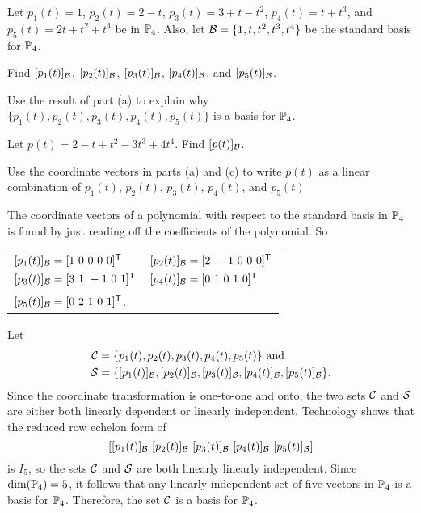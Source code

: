 \begin{example} Let $p_1(t)=1$, $p_2(t)=2-t$, $p_3(t)=3+t-t^2$, $p_4(t)= t+t^3$, and $p_5(t) = 2t+t^2+t^4$ be in $\mathbb{P}_4$. Also, let $\mathcal{B} = \{1, t ,t^2, t^3, t^4\}$ be the standard basis for $\mathbb{P}_4$. 
	\ba
	\item Find $[p_1(t)]_{\mathcal{B}}$, $[p_2(t)]_{\mathcal{B}}$, $[p_3(t)]_{\mathcal{B}}$, $[p_4(t)]_{\mathcal{B}}$, and $[p_5(t)]_{\mathcal{B}}$. 
	
	\item Use the result of part (a) to explain why $\{p_1(t), p_2(t), p_3(t), p_4(t), p_5(t)\}$ is a basis for $\mathbb{P}_4$. 
	
	\item Let $p(t) = 2-t+t^2-3t^3+4t^4$. Find $[p(t)]_{\mathcal{B}}$. 
	
	\item Use the coordinate vectors in parts (a) and (c) to write $p(t)$ as a linear combination of $p_1(t)$, $p_2(t)$, $p_3(t)$, $p_4(t)$, and $p_5(t)$
	
	\ea

\ExampleSolution

	\ba
	\item The coordinate vectors of a polynomial with respect to the standard basis in $\mathbb{P}_4$ is found by just reading off the coefficients of the polynomial. So
	\begin{center}
	\begin{tabular}{ll} 
	$[p_1(t)]_{\mathcal{B}} = [1 \ 0 \ 0 \ 0 \ 0 ]^{\mathsf{T}}$ &$[p_2(t)]_{\mathcal{B}} = [2 \ -1 \ 0 \ 0 \ 0]^{\mathsf{T}}$ \\
	$[p_3(t)]_{\mathcal{B}} = [3 \ 1 \ -1 \ 0 \ 1]^{\mathsf{T}}$ &$[p_4(t)]_{\mathcal{B}} = [0 \ 1 \ 0 \ 1 \ 0]^{\mathsf{T}}$ \\
	$[p_5(t)]_{\mathcal{B}} = [0 \ 2 \ 1 \ 0 \ 1]^{\mathsf{T}}$. &
	\end{tabular}
	\end{center}
	
	\item Let 
	\begin{align*}
	\mathcal{C} &= \{p_1(t), p_2(t), p_3(t), p_4(t), p_5(t)\} \text{ and } \\
	\mathcal{S} &= \{[p_1(t)]_{\mathcal{B}}, [p_2(t)]_{\mathcal{B}}, [p_3(t)]_{\mathcal{B}}, [p_4(t)]_{\mathcal{B}},[p_5(t)]_{\mathcal{B}}\}.
	\end{align*} 
	Since the coordinate transformation is one-to-one and onto, the two sets $\mathcal{C}$ and $\mathcal{S}$ are either both linearly dependent or linearly independent. Technology shows that the reduced row echelon form of 
	\[[[p_1(t)]_{\CB} \ [p_2(t)]_{\CB} \ [p_3(t)]_{\CB} \ [p_4(t)]_{\CB} \ [p_5(t)]_{\CB}]\]
	is $I_5$, so the sets $\mathcal{C}$ and $\mathcal{S}$ are both linearly linearly independent. Since $\dim(\mathbb{P}_4) = 5$, it follows that any linearly independent set of five vectors in $\mathbb{P}_4$ is a basis for $\mathbb{P}_4$. Therefore, the set $\mathcal{C}$ is a basis for $\mathbb{P}_4$. 
	

\end{example}
